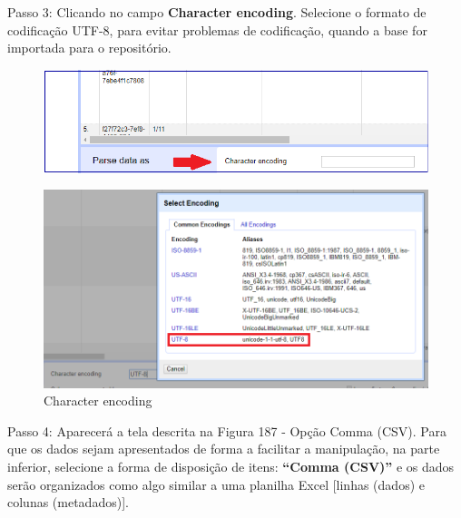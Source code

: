 \documentclass[12pt,hidelinks]{article}
\begin{document}
\newpage

    Passo 3: Clicando no campo \textbf{Character encoding}. Selecione o formato de codificação UTF-8, para evitar problemas de codificação, quando a base for importada para o repositório.  
    
    \begin{figure}[!htp]
                \centering
                \includegraphics[scale=0.7]{figura/Figura186.png}
            \label{Rotulo}
        \end{figure}
    
    \begin{figure}[!htp]
                \centering
                \includegraphics[scale=0.7]{figura/Figura186-1.png}
                \caption{Character  encoding}
            \label{Rotulo}
        \end{figure}
    
    Passo 4: Aparecerá a tela descrita na Figura 187 - Opção Comma (CSV). Para que os dados sejam apresentados de forma a facilitar a manipulação, na parte inferior, selecione a forma de disposição de itens: \textbf{“Comma (CSV)”} e os dados serão organizados como algo similar a uma planilha Excel [linhas (dados) e colunas (metadados)].
    
\end{document}
